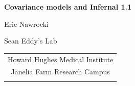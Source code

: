 \documentclass[landscape]{slides}
\begin{document}
\begin{slide}
\begin{center}
\large{\textbf{Covariance models and Infernal 1.1}}

\normalsize

Eric Nawrocki

Sean Eddy's Lab


\medskip

\medskip

\small

\begin{tabular}{c}
Howard Hughes Medical Institute \\ 
Janelia Farm Research Campus \\
\\
\end{tabular}

\vspace{0.1in}

\end{center}
\end{slide}
\end{document}
